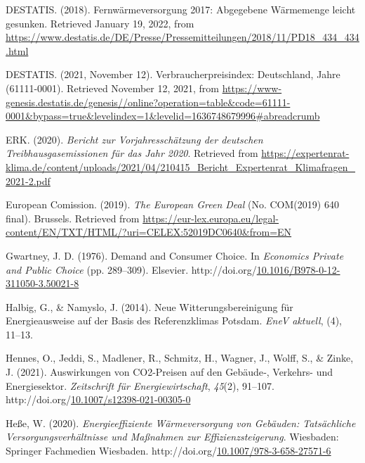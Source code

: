 \documentclass[12pt,twoside]{reedthesis}
\newlength{\cslhangindent}
\newenvironment{CSLReferences}[2] %
 {%
  \setlength{\parindent}{0pt}
  \ifodd #1 \everypar{\setlength{\hangindent}{\cslhangindent}}\ignorespaces\fi
  \ifnum #2 > 0
  \setlength{\parskip}{#2\baselineskip}
  \fi
 }%
 {}
\begin{document}
\begin{CSLReferences}{1}{0}
\leavevmode{}%
DESTATIS. (2018). Fernwärmeversorgung 2017: Abgegebene Wärmemenge leicht gesunken. Retrieved January 19, 2022, from \url{https://www.destatis.de/DE/Presse/Pressemitteilungen/2018/11/PD18_434_434.html}

\leavevmode{}%
DESTATIS. (2021, November 12). Verbraucherpreisindex: Deutschland, Jahre (61111-0001). Retrieved November 12, 2021, from \url{https://www-genesis.destatis.de/genesis//online?operation=table\&code=61111-0001\&bypass=true\&levelindex=1\&levelid=1636748679996\#abreadcrumb}

\leavevmode{}%
ERK. (2020). \emph{Bericht zur Vorjahresschätzung der deutschen Treibhausgasemissionen für das Jahr 2020}. Retrieved from \url{https://expertenrat-klima.de/content/uploads/2021/04/210415_Bericht_Expertenrat_Klimafragen_2021-2.pdf}

\leavevmode{}%
European Comission. (2019). \emph{The European Green Deal} (No. COM(2019) 640 final). Brussels. Retrieved from \url{https://eur-lex.europa.eu/legal-content/EN/TXT/HTML/?uri=CELEX:52019DC0640\&from=EN}

\leavevmode{}%
Gwartney, J. D. (1976). Demand and Consumer Choice. In \emph{Economics Private and Public Choice} (pp. 289--309). Elsevier. http://doi.org/\href{https://doi.org/10.1016/B978-0-12-311050-3.50021-8}{10.1016/B978-0-12-311050-3.50021-8}

\leavevmode{}%
Halbig, G., \& Namyslo, J. (2014). Neue Witterungsbereinigung für Energieausweise auf der Basis des Referenzklimas Potsdam. \emph{EneV aktuell}, (4), 11--13.

\leavevmode{}%
Hennes, O., Jeddi, S., Madlener, R., Schmitz, H., Wagner, J., Wolff, S., \& Zinke, J. (2021). Auswirkungen von CO2-Preisen auf den Gebäude‑, Verkehrs- und Energiesektor. \emph{Zeitschrift für Energiewirtschaft}, \emph{45}(2), 91--107. http://doi.org/\href{https://doi.org/10.1007/s12398-021-00305-0}{10.1007/s12398-021-00305-0}

\leavevmode{}%
Heße, W. (2020). \emph{Energieeffiziente Wärmeversorgung von Gebäuden: Tatsächliche Versorgungsverhältnisse und Maßnahmen zur Effizienzsteigerung}. Wiesbaden: Springer Fachmedien Wiesbaden. http://doi.org/\href{https://doi.org/10.1007/978-3-658-27571-6}{10.1007/978-3-658-27571-6}


\end{CSLReferences}
\end{document}
